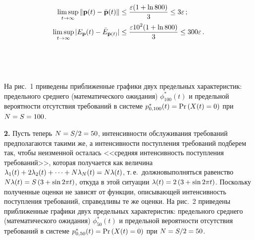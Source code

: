 {\begin{multicols}{2}
\noindent
\begin{align*}
\limsup\limits_{t \to \infty}  \|{\bf p}(t)- \bar{\bf p}(t)\| &\le
\displaystyle\frac{\displaystyle \varepsilon(1+\ln{800})\mathstrut}{\displaystyle 3\mathstrut} \le 3\varepsilon\,;
\\
\limsup_{t \to \infty}   |E_{\bf p}(t)- \bar{E}_{\bar{\bf p}(t)}|&\le
\displaystyle\frac{\displaystyle \varepsilon 10^2(1+\ln{800})\mathstrut}{\displaystyle 3\mathstrut} \le 300\varepsilon\,.
\end{align*}

\begin{figure*}[b] %
\vspace*{9pt}
\begin{center}
\mbox{%
\epsfxsize=161.688mm
}
\end{center}
\vspace*{-9pt}
\vspace*{18pt}
\begin{center}
\mbox{%
\epsfxsize=161.688mm
}
\end{center}
\vspace*{-9pt}
\end{figure*}



На рис.~1 приведены приближенные графики двух предельных
характеристик: предельного  среднего (математического ожидания)
$\phi^*_{100}(t)$ и предельной вероятности отсутствия требований в
сис\-те\-ме $p^*_{0,100}(t)\hm=\mathrm{Pr}\left(X(t)\hm=0\right)$ при $N\hm=S\hm=100$.

\smallskip


{\bf 2.} Пусть теперь $N\hm=S/2\hm=50$, интенсивности обслуживания
требований предполагаются такими же, а интенсивности поступления
требо\-ва\-ний подберем так, чтобы неизменной осталась <<средняя
интенсивность поступления требований>>, которая получается как
величина $\lambda_1(t)\hm+2\lambda_2(t)+ \dots + N\lambda_N(t)\hm=
N\lambda(t)$, т.\,е.\ должно\linebreak выполнять\-ся равенство $N\lambda(t)\hm =
S\left(3\hm+\sin{2\pi t}\right)$, откуда в этой ситуации
$\lambda(t)\hm=2\left(3\hm+\sin{2\pi t}\right)$. Поскольку полученные
оценки не зависят от функции, описывающей интенсивность поступления
требований, справедливы те же оценки. На рис.~2 приведены
приближенные графики двух предельных характеристик: предельного
среднего (математического ожидания) $\phi^*_{50}(t)$ и предельной
вероятности отсутствия требований в системе
$p^*_{0,50}(t)\hm=\mathrm{Pr}\left(X(t)=0\right)$ при $N\hm=S/2\hm=50$.


\end{multicols}}
